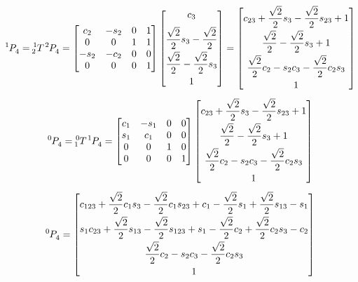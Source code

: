 \documentclass[10pt]{article}
\begin{document}
\[
\tensor*[^{1}]{P}{_{4}} = \tensor*[^{1}_{2}]{T}{} \tensor*[^{2}]{P}{_{4}} =
\begin{bmatrix}
    c_{2}        & -s_{2}       & 0     & 1      \\
    0            & 0            & 1     & 1      \\
    -s_{2}       & -c_{2}       & 0     & 0      \\
    0            & 0            & 0     & 1
\end{bmatrix}
\begin{bmatrix}
   c_{3} \\[6pt] \dfrac{\sqrt{2}}{2} s_{3} - \dfrac{\sqrt{2}}{2} \\[6pt] \dfrac{\sqrt{2}}{2} - \dfrac{\sqrt{2}}{2} s_{3} \\[6pt]  1
\end{bmatrix} =
\begin{bmatrix}
    c_{23} + \dfrac{\sqrt{2}}{2}s_{3} - \dfrac{\sqrt{2}}{2} s_{23}  +  1        \\[6pt]
    \dfrac{\sqrt{2}}{2} - \dfrac{\sqrt{2}}{2} s_{3} +  1                        \\[6pt]
    \dfrac{\sqrt{2}}{2}c_{2} - s_{2}c_{3} - \dfrac{\sqrt{2}}{2}c_{2}s_{3}       \\[6pt]
    1
\end{bmatrix}
\]
\[
\tensor*[^{0}]{P}{_{4}} = \tensor*[^{0}_{1}]{T}{} \tensor*[^{1}]{P}{_{4}} =
\begin{bmatrix}
    c_{1}        & -s_{1}       & 0     & 0      \\
    s_{1}        & c_{1}        & 0     & 0      \\
    0            & 0            & 1     & 0      \\
    0            & 0            & 0     & 1
\end{bmatrix}
\begin{bmatrix}
    c_{23} + \dfrac{\sqrt{2}}{2}s_{3} - \dfrac{\sqrt{2}}{2} s_{23}  +  1        
    \\[6pt]
    \dfrac{\sqrt{2}}{2} - \dfrac{\sqrt{2}}{2} s_{3} +  1                        
    \\[6pt]
    \dfrac{\sqrt{2}}{2}c_{2} - s_{2}c_{3} - \dfrac{\sqrt{2}}{2}c_{2}s_{3}       
    \\[6pt]
    1
\end{bmatrix} 
\]
\[
\tensor*[^{0}]{P}{_{4}} =
\begin{bmatrix}
   c_{123} + \dfrac{\sqrt{2}}{2}c_{1}s_{3} - \dfrac{\sqrt{2}}{2}c_{1}s_{23}  +  c_{1} - \dfrac{\sqrt{2}}{2}s_{1} + \dfrac{\sqrt{2}}{2} s_{13} -  s_{1} 
   \\[6pt]
   s_{1}c_{23} + \dfrac{\sqrt{2}}{2}s_{13} - \dfrac{\sqrt{2}}{2} s_{123}  +  s_{1} - \dfrac{\sqrt{2}}{2}c_{2} + \dfrac{\sqrt{2}}{2}c_{2}s_{3} - c_{2} 
   \\[6pt]
   \dfrac{\sqrt{2}}{2}c_{2} - s_{2}c_{3} - \dfrac{\sqrt{2}}{2}c_{2}s_{3} 
   \\[6pt]
   1
\end{bmatrix}
\]
\end{document}

